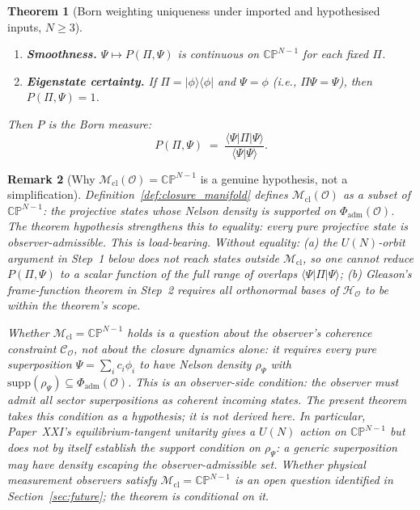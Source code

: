 \documentclass[12pt]{article}
\newtheorem{theorem}{Theorem}
\newtheorem{remark}[theorem]{Remark}
\newcommand{\Ocal}{\mathcal{O}}
\newcommand{\Ccal}{\mathcal{C}}
\newcommand{\Hcal}{\mathcal{H}}
\newcommand{\Mcl}{\mathcal{M}_{\mathrm{cl}}}
\begin{document}
\begin{theorem}[Born weighting uniqueness under imported and hypothesised inputs, $N \geq 3$]
\begin{enumerate}
    \item[\textbf{(U3)}] \textbf{Smoothness.} $\Psi \mapsto P(\Pi, \Psi)$ is continuous on $\mathbb{CP}^{N-1}$ for each fixed $\Pi$.
    \item[\textbf{(U4)}] \textbf{Eigenstate certainty.} If $\Pi = |\phi\rangle\langle\phi|$ and $\Psi = \phi$ (i.e., $\Pi\Psi = \Psi$), then $P(\Pi, \Psi) = 1$.
\end{enumerate}
Then $P$ is the Born measure:
\begin{equation}\label{eq:born_forced}
    P(\Pi, \Psi) \;=\; \frac{\langle\Psi | \Pi | \Psi\rangle}{\langle\Psi|\Psi\rangle}.
\end{equation}
\end{theorem}

\begin{remark}[Why $\Mcl(\Ocal) = \mathbb{CP}^{N-1}$ is a genuine hypothesis, not a simplification]\label{rem:full_CP_hypothesis}
Definition~\ref{def:closure_manifold} defines $\Mcl(\Ocal)$ as a \emph{subset} of $\mathbb{CP}^{N-1}$: the projective states whose Nelson density is supported on $\Phi_{\mathrm{adm}}(\Ocal)$. The theorem hypothesis strengthens this to equality: every pure projective state is observer-admissible. This is load-bearing. Without equality: (a) the $U(N)$-orbit argument in Step~1 below does not reach states outside $\Mcl$, so one cannot reduce $P(\Pi, \Psi)$ to a scalar function of the full range of overlaps $\langle\Psi|\Pi|\Psi\rangle$; (b) Gleason's frame-function theorem in Step~2 requires all orthonormal bases of $\Hcal_\Ocal$ to be within the theorem's scope.

Whether $\Mcl = \mathbb{CP}^{N-1}$ holds is a question about the observer's coherence constraint $\Ccal_\Ocal$, not about the closure dynamics alone: it requires every pure superposition $\Psi = \sum_i c_i \phi_i$ to have Nelson density $\rho_\Psi$ with $\mathrm{supp}(\rho_\Psi) \subseteq \Phi_{\mathrm{adm}}(\Ocal)$. This is an observer-side condition: the observer must admit all sector superpositions as coherent incoming states. The present theorem takes this condition as a \emph{hypothesis}; it is not derived here. In particular, Paper~XXI's equilibrium-tangent unitarity gives a $U(N)$ action on $\mathbb{CP}^{N-1}$ but does \emph{not} by itself establish the support condition on $\rho_\Psi$: a generic superposition may have density escaping the observer-admissible set. Whether physical measurement observers satisfy $\Mcl = \mathbb{CP}^{N-1}$ is an open question identified in Section~\ref{sec:future}; the theorem is conditional on it.
\end{remark}
\end{document}
